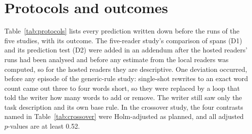 \section{Protocols and outcomes}
\label{app:protocols}

Table~\ref{tab:protocols} lists every prediction written down before the runs of the five studies, with
its outcome. The five-reader study's comparison of spans (D1) and its prediction test (D2) were added in
an addendum after the hosted readers' runs had been analysed and before any estimate from the local
readers was computed, so for the hosted readers they are descriptive. One deviation occurred, before any
episode of the generic-rule study: single-shot rewrites to an exact word count came out three to four
words short, so they were replaced by a loop that told the writer how many words to add or remove. The
writer still saw only the task description and its own base rule. In the crossover study, the four
contrasts named in Table~\ref{tab:crossover} were Holm-adjusted as planned, and all adjusted $p$-values
are at least 0.52.

